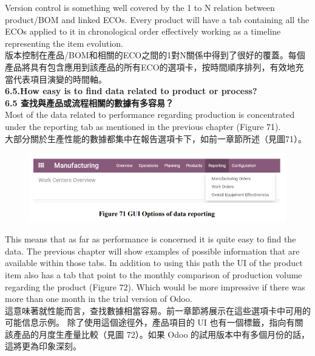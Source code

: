 \documentclass[12pt,a4paper]{report}  %
\begin{document}
Version control is something well covered by the 1 to N relation between product/BOM 
and linked ECOs. Every product will have a tab containing all the ECOs applied to it in 
chronological order effectively working as a timeline representing the item evolution. \\
版本控制在產品/BOM和相關的ECO之間的1對N關係中得到了很好的覆蓋。每個產品將具有包含應用到該產品的所有ECO的選項卡，按時間順序排列，有效地充當代表項目演變的時間軸。\\

\Large\textbf{6.5.How easy is to find data related to product or process?}\\
\Large\textbf{6.5 查找與產品或流程相關的數據有多容易？}\\

Most of the data related to performance regarding production is concentrated under the reporting tab as mentioned in the previous chapter (Figure 71).\\
大部分關於生產性能的數據都集中在報告選項卡下，如前一章節所述（見圖71）。\\

\begin{figure}[htbp]
  \centering
  \includegraphics[]{image/602.png}
  \label{fig:602}
\end{figure}

This means that as far as performance is concerned it is quite easy to find the data. The previous chapter will show examples of possible information that are available within those tabs. In addition to using this path the UI of the product item also has a tab that point to the monthly comparison of production volume regarding the product (Figure 72). Which would be more impressive if there was more than one month in the trial version of Odoo.\\
這意味著就性能而言，查找數據相當容易。前一章節將展示在這些選項卡中可用的可能信息示例。
除了使用這個途徑外，產品項目的 UI 也有一個標籤，指向有關該產品的月度生產量比較（見圖 72）。如果 Odoo 的試用版本中有多個月份的話，這將更為印象深刻。\\
\end{document}
